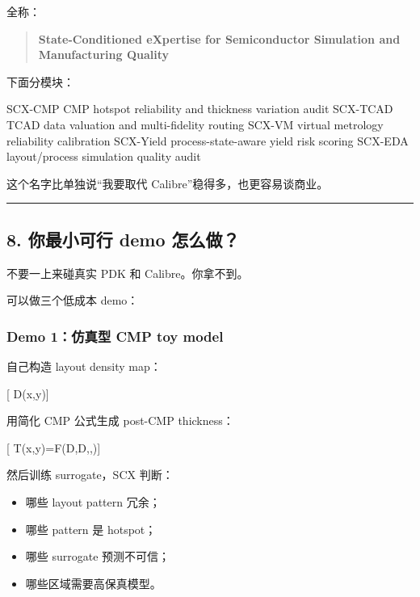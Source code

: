 \documentclass[
  12pt,
]{ctexart}
\newenvironment{Shaded}{}{}
\newcommand{\NormalTok}[1]{#1}
\providecommand{\tightlist}{%
  \setlength{\itemsep}{0pt}\setlength{\parskip}{0pt}}
\begin{document}
全称：

\begin{quote}
\textbf{State-Conditioned eXpertise for Semiconductor Simulation and
Manufacturing Quality}
\end{quote}

下面分模块：

\begin{Shaded}
\begin{Highlighting}[]
\NormalTok{SCX{-}CMP       CMP hotspot reliability and thickness variation audit}
\NormalTok{SCX{-}TCAD      TCAD data valuation and multi{-}fidelity routing}
\NormalTok{SCX{-}VM        virtual metrology reliability calibration}
\NormalTok{SCX{-}Yield     process{-}state{-}aware yield risk scoring}
\NormalTok{SCX{-}EDA       layout/process simulation quality audit}
\end{Highlighting}
\end{Shaded}

这个名字比单独说``我要取代 Calibre''稳得多，也更容易谈商业。

\begin{center}\rule{0.5\linewidth}{0.5pt}\end{center}

\subsection{8. 你最小可行 demo
怎么做？}\label{ux4f60ux6700ux5c0fux53efux884c-demo-ux600eux4e48ux505a}

不要一上来碰真实 PDK 和 Calibre。你拿不到。

可以做三个低成本 demo：

\subsubsection{Demo 1：仿真型 CMP toy
model}\label{demo-1ux4effux771fux578b-cmp-toy-model}

自己构造 layout density map：

{[} D(x,y){]}

用简化 CMP 公式生成 post-CMP thickness：

{[} T(x,y)=F(D,\nabla D,,){]}

然后训练 surrogate，SCX 判断：

\begin{itemize}
\tightlist
\item
  哪些 layout pattern 冗余；
\item
  哪些 pattern 是 hotspot；
\item
  哪些 surrogate 预测不可信；
\item
  哪些区域需要高保真模型。
\end{itemize}
\end{document}
